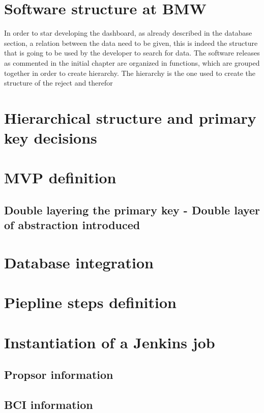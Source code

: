 \documentclass[../main.tex]{subfiles}
\begin{document}
\section{Software structure at BMW}
In order to star developing the dashboard, as already described in the database section, a relation between the data need to be given, this is indeed the structure that is going to be used by the developer to search for data. The software releases as commented in the initial chapter are organized in functions, which are grouped together in order to create hierarchy. The hierarchy is the one used to create the structure of the reject and therefor
\section{Hierarchical structure and primary key decisions}
\section{MVP definition}
\subsection{Double layering the primary key - Double layer of abstraction introduced}
\section{Database integration}
\section{Piepline steps definition}
\section{Instantiation of a Jenkins job}
\subsection{Propsor information}
\subsection{BCI information}
\cleardoublepage
\end{document}
